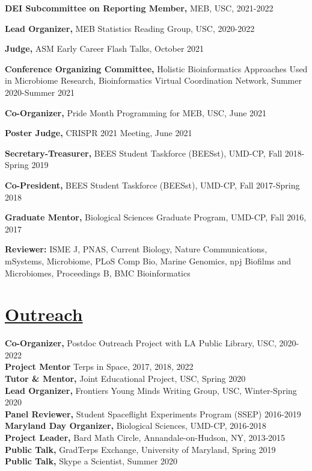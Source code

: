 \documentclass[]{res}
\begin{document}
\begin{resume}
{\bf DEI Subcommittee on Reporting Member,} {MEB}, USC, 2021-2022

{\bf Lead Organizer,} {MEB Statistics Reading Group}, USC, 2020-2022

{\bf Judge,} ASM Early Career Flash Talks, October 2021

{\bf Conference Organizing Committee,} {Holistic Bioinformatics Approaches Used in Microbiome Research}, Bioinformatics Virtual Coordination Network, Summer 2020-Summer 2021

{\bf Co-Organizer,} {Pride Month Programming for MEB}, USC, June 2021


{\bf Poster Judge,} {CRISPR 2021 Meeting}, June 2021

{\bf Secretary-Treasurer,} {BEES Student Taskforce (BEESst)}, UMD-CP, Fall 2018-Spring 2019 %

{\bf Co-President,} {BEES Student Taskforce (BEESst)}, UMD-CP, Fall 2017-Spring 2018

{\bf Graduate Mentor,} {Biological Sciences Graduate Program}, UMD-CP, Fall 2016, 2017 %

{\bf Reviewer:} ISME J, PNAS, Current Biology, Nature Communications, mSystems, Microbiome, PLoS Comp Bio, Marine Genomics, npj Biofilms and Microbiomes, Proceedings B, BMC Bioinformatics\\


\section{\underline{Outreach}}\vspace{2mm}
{\bf Co-Organizer,} Postdoc Outreach Project with LA Public Library, USC, 2020-2022\\
{\bf Project Mentor} Terps in Space, 2017, 2018, 2022\\
{\bf Tutor \& Mentor,} Joint Educational Project, USC, Spring 2020\\
{\bf Lead Organizer,} Frontiers Young Minds Writing Group, USC, Winter-Spring 2020\\
{\bf Panel Reviewer,} Student Spaceflight Experiments Program (SSEP) 2016-2019\\
{\bf Maryland Day Organizer,} Biological Sciences, UMD-CP, 2016-2018\\
{\bf Project Leader,} Bard Math Circle, Annandale-on-Hudson, NY, 2013-2015 \\
{\bf Public Talk,} GradTerps Exchange, University of Maryland, Spring 2019\\
{\bf Public Talk,} Skype a Scientist, Summer 2020


\end{resume}
\end{document}
